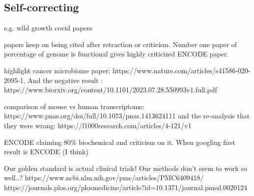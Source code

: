 

\subsection{Self-correcting}

e.g. wild growth covid papers

papers keep on being cited after retraction or criticism. Number one paper of percentage of genome is functional gives highly criticized ENCODE paper.

highlight cancer microbiome paper: https://www.nature.com/articles/s41586-020-2095-1. And the negative result : https://www.biorxiv.org/content/10.1101/2023.07.28.550993v1.full.pdf

comparison of mouse vs human transcriptome: https://www.pnas.org/doi/full/10.1073/pnas.1413624111 and the re-analysis that they were wrong: https://f1000research.com/articles/4-121/v1

ENCODE claiming 80\% biochemical and criticism on it. When googling first result is ENCODE (I think)

Our golden standard is actual clinical trials! Our methods don't seem to work so well..?
https://www.ncbi.nlm.nih.gov/pmc/articles/PMC6409418/
https://journals.plos.org/plosmedicine/article?id=10.1371/journal.pmed.0020124


